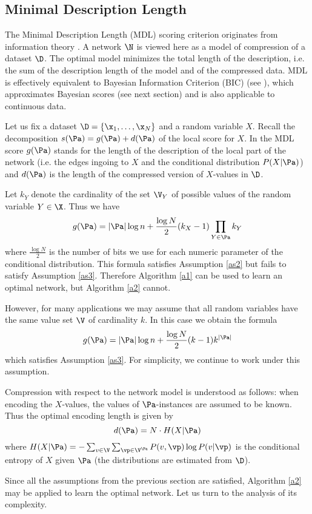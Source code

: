 \subsection{Minimal Description Length}

 The Minimal Description Length (MDL) scoring criterion originates from information theory \cite{lam94}. 
 A network $\N$ is viewed here as a model of compression of a dataset $\D$. 
 The optimal model minimizes the total length of the description, i.e. the sum of the description length of the model and of the compressed data.
 MDL is effectively equivalent to Bayesian Information Criterion (BIC) 
 (see \cite{neapolitan03}), 
 which approximates Bayesian scores (see next section) 
 and is also applicable to continuous data.

 Let us fix a dataset $\D=\{\x_1,\ldots,\x_N\}$ and a random variable $X$. 
 Recall the decomposition $s(\Pa)=g(\Pa)+d(\Pa)$ of the local score for $X$. 
 In the MDL score $g(\Pa)$ stands for the length of the description of the local part of the network (i.e. the edges ingoing to $X$ and the conditional distribution $P(X|\Pa)$) and $d(\Pa)$ is the length of the compressed version of $X$-values in $\D$.
 
 Let $k_Y$ denote the cardinality of the set $\V_Y$ of possible values of the random variable $Y\in\X$.
 Thus we have 
 $$g(\Pa)=|\Pa|\log n+\frac{\log N}{2}(k_X-1)\prod_{Y\in\Pa}k_Y$$
 where $\frac{\log N}{2}$ is the number of bits we use for each numeric parameter of the conditional distribution. 
 This formula satisfies Assumption \ref{as2} but fails to satisfy Assumption \ref{as3}.
 Therefore Algorithm \ref{a1} can be used to learn an optimal network, but Algorithm \ref{a2} cannot. 
 
 However, for many applications we may assume that 
 all random variables have the same value set $\V$ of cardinality $k$.
 In this case we obtain the formula
 $$g(\Pa)=|\Pa|\log n+\frac{\log N}{2}(k-1)k^{|\Pa|}$$
 which satisfies Assumption \ref{as3}.
 For simplicity, we continue to work under this assumption.
 
 Compression with respect to the network model is understood as follows: when encoding the $X$-values, the values of $\Pa$-instances are assumed to be known. 
 Thus the optimal encoding length is given by 
 $$d(\Pa)=N\cdot H(X|\Pa)$$
 where $H(X|\Pa)=-\sum_{v\in\V}\sum_{\vp\in\V^{\Pa}}P(v,\vp)\log P(v|\vp)$ is the conditional entropy of $X$ given $\Pa$ (the distributions are estimated from $\D$).
 
 Since all the assumptions from the previous section are satisfied, Algorithm \ref{a2} may be applied to learn the optimal network. 
 Let us turn to the analysis of its complexity.
 
